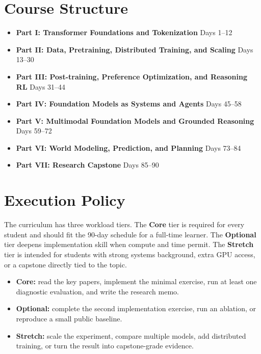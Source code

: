 \documentclass[11pt]{article}
\begin{document}
\section*{Course Structure}

\begin{itemize}
    \item \textbf{Part I: Transformer Foundations and Tokenization} \hfill Days 1--12
    \item \textbf{Part II: Data, Pretraining, Distributed Training, and Scaling} \hfill Days 13--30
    \item \textbf{Part III: Post-training, Preference Optimization, and Reasoning RL} \hfill Days 31--44
    \item \textbf{Part IV: Foundation Models as Systems and Agents} \hfill Days 45--58
    \item \textbf{Part V: Multimodal Foundation Models and Grounded Reasoning} \hfill Days 59--72
    \item \textbf{Part VI: World Modeling, Prediction, and Planning} \hfill Days 73--84
    \item \textbf{Part VII: Research Capstone} \hfill Days 85--90
\end{itemize}

\section*{Execution Policy}

The curriculum has three workload tiers. The \textbf{Core} tier is required for every student and should fit the 90-day schedule for a full-time learner. The \textbf{Optional} tier deepens implementation skill when compute and time permit. The \textbf{Stretch} tier is intended for students with strong systems background, extra GPU access, or a capstone directly tied to the topic.

\begin{itemize}
    \item \textbf{Core:} read the key papers, implement the minimal exercise, run at least one diagnostic evaluation, and write the research memo.
    \item \textbf{Optional:} complete the second implementation exercise, run an ablation, or reproduce a small public baseline.
    \item \textbf{Stretch:} scale the experiment, compare multiple models, add distributed training, or turn the result into capstone-grade evidence.
\end{itemize}
\end{document}
